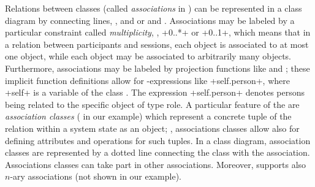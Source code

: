 Relations between classes (called \emph{associations} in \UML)
can be represented in a class diagram by connecting lines, \eg,
 and  or 
and . Associations may be labeled by a particular
constraint called \emph{multiplicity}, \eg, \inlineocl+0..*+ or
\inlineocl+0..1+, which means that in a relation between participants
and sessions, each  object is associated to at
most one  object, while each 
object may be associated to arbitrarily many 
objects. Furthermore, associations may be labeled by projection
functions like  and ; these implicit
function definitions allow for \OCL-expressions like
\inlineocl+self.person+, where \inlineocl+self+ is a variable of the
class . The expression \inlineocl+self.person+ denotes
persons being related to the specific object  of
type role. A particular feature of the \UML are \emph{association
  classes} ( in our example) which represent a
concrete tuple of the relation within a system state as an object;
\ie, associations classes allow also for defining attributes and
operations for such tuples. In a class diagram, association classes
are represented by a dotted line connecting the class with the
association. Associations classes can take part in other associations.
Moreover, \UML supports also $n$-ary associations (not shown in
our example).

